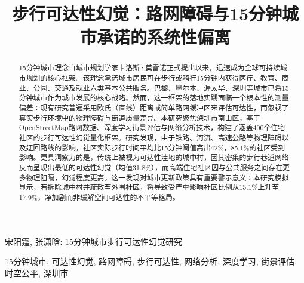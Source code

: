 \documentclass[10pt,conference]{IEEEtran}
\begin{document}
\title{步行可达性幻觉：路网障碍与15分钟城市承诺的系统性偏离}


\author{
}

%
{宋阳霆, 张潇晗: 15分钟城市步行可达性幻觉研究}

\maketitle

\begin{abstract}
15分钟城市理念自城市规划学家卡洛斯·莫雷诺正式提出以来，迅速成为全球可持续城市规划的核心框架。该理念承诺城市居民可在步行或骑行15分钟内获得医疗、教育、商业、公园、交通及就业六类基本公共服务。巴黎、墨尔本、渥太华、深圳等城市已将15分钟城市作为城市发展的核心战略。然而，这一框架的落地实践面临一个根本性的测量偏差：现有研究普遍采用欧氏（直线）距离或简单路网缓冲区来评估可达性，而忽视了真实步行环境中的物理障碍与街道质量差异。本研究聚焦深圳市南山区，基于OpenStreetMap路网数据、深度学习街景评估与网络分析技术，构建了涵盖400个住宅社区的步行可达性幻觉量化框架。研究发现，由于铁路、河流、高速公路等物理障碍以及迂回路线的影响，社区实际步行时间平均比15分钟阈值高出42\%，85.1\%的社区受到影响。更具洞察力的是，传统上被视为可达性洼地的城中村，因其密集的步行巷道网络反而呈现出最低的可达性幻觉（均值31.8\%），而高端住宅社区因与公共服务之间存在更多物理阻隔，幻觉程度更高。这一发现对城市更新政策具有重要警示意义：本研究模拟显示，若拆除城中村并疏散至外围社区，将导致受严重影响社区比例从15.1\%上升至17.9\%，净加剧而非缓解空间可达性的不平等格局。
\end{abstract}

\begin{IEEEkeywords}
15分钟城市, 可达性幻觉, 路网障碍, 步行可达性, 网络分析, 深度学习, 街景评估, 时空公平, 深圳市
\end{IEEEkeywords}
\end{document}
